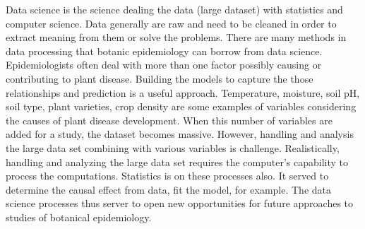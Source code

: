 \documentclass[12pt,a4paper]{article}
\begin{document}


Data science is the science dealing the data (large dataset) with statistics and computer science. Data generally are raw and need to be cleaned in order to extract meaning from them or solve the problems. There are many methods in data processing that botanic epidemiology can borrow from data science. Epidemiologists often deal with more than one factor possibly causing or contributing to plant disease. Building the models to capture the those relationships and prediction is a useful approach. Temperature, moisture, soil pH, soil type, plant varieties, crop density are some examples of variables considering the causes of plant disease development.  When this number of variables are added for a study, the dataset becomes massive. However, handling and analysis  the large data set combining with various variables is challenge. Realistically, handling and analyzing the large data set requires the computer's capability to process the computations. Statistics is on these processes also. It served to determine the causal effect from data, fit the model, for example. The data science processes thus server to open new opportunities for future approaches to studies of botanical epidemiology.

\end{document}
